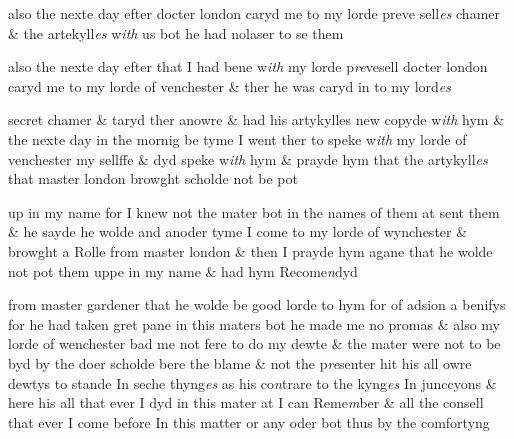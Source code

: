 \documentclass[12pt, a4paper]{book}
\begin{document}
	
				\marginpar[\vspace{0.5cm}{\textcolor{Gray}{n}}]{}
			
	
		\ifthenelse{\isodd{\thepage}}
		{\reversemarginpar}
		{\normalmarginpar}
		also the nexte day efter docter london caryd me to my lorde preve sell\textit{es}
	chamer \& the artekyll\textit{es} w\textit{ith} us bot he had nolaser to se them


				\marginpar[\vspace{0.5cm}{\textcolor{Gray}{n}}]{}
			 
		\ifthenelse{\isodd{\thepage}}
		{\reversemarginpar}
		{\normalmarginpar}
		also the nexte day efter that I had bene w\textit{ith} my lorde p\textit{re}vesell docter london
 	caryd me to my lorde of venchester \& ther he was caryd in to my lord\textit{es}
 	
				\marginpar[\vspace{0.5cm}{\textcolor{Gray}{n}}]{}
			
		\ifthenelse{\isodd{\thepage}}
		{\reversemarginpar}
		{\normalmarginpar}
		secret chamer \& taryd ther anowre  \& had
			 his artykylles new copyde
 w\textit{ith} hym \& the nexte day in the mornig be tyme I went ther to
 	speke w\textit{ith} my lorde of venchester my sellffe \& dyd speke w\textit{ith} hym \& prayde
	hym that the artykyll\textit{es} that master london browght scholde not be pot
	
		
				\marginpar[\vspace{0.5cm}{\textcolor{Gray}{n}}]{}
			
 		
				\marginpar[\vspace{0.5cm}{\textcolor{Gray}{n}}]{}
			
 		
		\ifthenelse{\isodd{\thepage}}
		{\reversemarginpar}
		{\normalmarginpar}
		up in my name for I knew not the mater bot in the names of them at
 			sent them \& he sayde he wolde and anoder tyme I come to my lorde
 				of wynchester \& browght a Rolle from  master
			london \& then I prayde hym agane
 that he wolde not pot them uppe in my name \& had hym Recome\textit{n}dyd
	
 	
 		
				\marginpar[\vspace{0.5cm}{\textcolor{Gray}{n}}]{}
			
 		
				\marginpar[\vspace{0.5cm}{\textcolor{Gray}{n}}]{}
			
 		
		\ifthenelse{\isodd{\thepage}}
		{\reversemarginpar}
		{\normalmarginpar}
		from master gardener that he wolde be good lorde to hym for  of adsion
			 a benifys
 for he had taken gret pane in this maters bot he made me no
 promas \& also my lorde of wenchester bad me not fere to do my dewte
 \& the mater were not to be byd by the doer scholde bere the blame \&
 not the p\textit{re}senter hit his all owre dewtys to stande In seche thyng\textit{es}
 as his co\textit{n}trare to the kyng\textit{es} In junccyons \& here his all that ever
 I dyd in this mater at I can Reme\textit{m}ber \& all the consell that ever
 I come before In this matter or any oder bot thus by the comfortyng
 	
\end{document}
